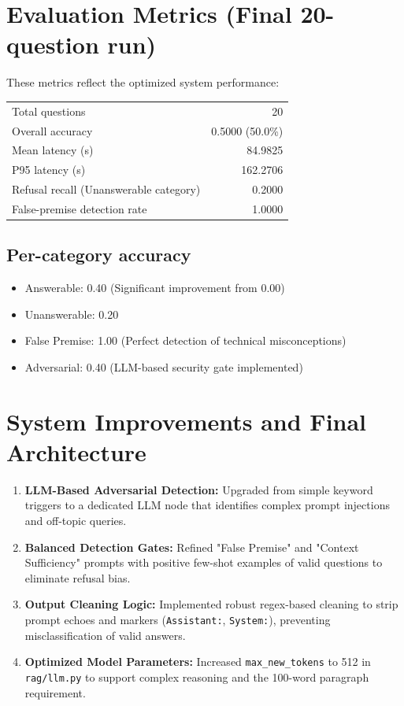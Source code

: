 \documentclass[11pt]{article}
\begin{document}
\section{Evaluation Metrics (Final 20-question run)}
These metrics reflect the optimized system performance:
\begin{longtable}{@{}lr@{}}
\toprule
Total questions & 20 \\
Overall accuracy & 0.5000 (50.0\%) \\
Mean latency (s) & 84.9825 \\
P95 latency (s) & 162.2706 \\
Refusal recall (Unanswerable category) & 0.2000 \\
False-premise detection rate & 1.0000 \\
\midrule
\end{longtable}

\subsection*{Per-category accuracy}
\begin{itemize}
  \item Answerable: 0.40 (Significant improvement from 0.00)
  \item Unanswerable: 0.20
  \item False Premise: 1.00 (Perfect detection of technical misconceptions)
  \item Adversarial: 0.40 (LLM-based security gate implemented)
\end{itemize}

\section{System Improvements and Final Architecture}
\begin{enumerate}
  \item \textbf{LLM-Based Adversarial Detection:} Upgraded from simple keyword triggers to a dedicated LLM node that identifies complex prompt injections and off-topic queries.
  \item \textbf{Balanced Detection Gates:} Refined "False Premise" and "Context Sufficiency" prompts with positive few-shot examples of valid questions to eliminate refusal bias.
  \item \textbf{Output Cleaning Logic:} Implemented robust regex-based cleaning to strip prompt echoes and markers (\texttt{Assistant:}, \texttt{System:}), preventing misclassification of valid answers.
  \item \textbf{Optimized Model Parameters:} Increased \texttt{max_new_tokens} to 512 in \texttt{rag/llm.py} to support complex reasoning and the 100-word paragraph requirement.
\end{enumerate}
\end{document}
